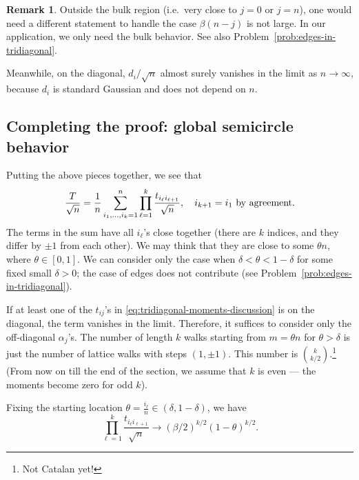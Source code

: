 \documentclass[letterpaper,11pt,oneside,reqno]{article}
\numberwithin{equation}{section}
\theoremstyle{definition}
\newtheorem{remark}[proposition]{Remark}
\begin{document}
\begin{remark}
Outside the bulk region (i.e.\ very close to $j=0$ or $j=n$), one would need a different statement to handle the case $\beta(n-j)$ is not large.
In our application, we only need the bulk behavior.
See also Problem~\ref{prob:edges-in-tridiagonal}.
\end{remark}

Meanwhile, on the diagonal, $d_i/\sqrt{n}$
almost surely vanishes in the limit as $n\to\infty$,
because $d_i$ is standard Gaussian and does not depend on $n$.



\subsection{Completing the proof: global semicircle behavior}

Putting the above pieces together, we see that
\begin{equation}
	\label{eq:tridiagonal-moments-discussion}
	\frac{T}{\sqrt n}=
	\frac{1}{n}
	\sum_{i_1,\dots,i_k=1}^n
	\prod_{\ell=1}^k
	\frac{t_{i_\ell i_{\ell+1}}}{\sqrt n},\quad
	i_{k+1}=i_1 \textnormal{ by agreement}.
\end{equation}
The terms in the sum have all $i_{\ell}$'s close together
(there are $k$ indices, and they differ by $\pm1$ from each other).
We
may think that they are close to some $\theta n$, where $\theta\in [0,1]$.
We can consider only the case when $\delta<\theta<1-\delta$ for some fixed small $\delta>0$;
the case of edges does not contribute (see Problem~\ref{prob:edges-in-tridiagonal}).

If at least one of the $t_{ij}$'s in \eqref{eq:tridiagonal-moments-discussion} is
on the diagonal, the term vanishes in the limit. Therefore,
it suffices to consider only the off-diagonal $\alpha_j$'s. The
number of length $k$ walks starting from $m=\theta n$ for $\theta>\delta$ is
just the number of lattice walks with steps $(1,\pm 1)$. This number is $\binom{k}{k/2}$.\footnote{Not Catalan yet!}
(From now on till the end of the section, we assume that
$k$ is even --- the moments become zero for odd $k$).

Fixing the starting location $\theta=\frac{i_\ell}{n}\in(\delta,1-\delta)$, we have
\begin{equation*}
	\prod_{\ell=1}^k
	\frac{t_{i_\ell i_{\ell+1}}}{\sqrt n}\to (\beta/2)^{k/2}(1-\theta)^{k/2}.
\end{equation*}
\end{document}
